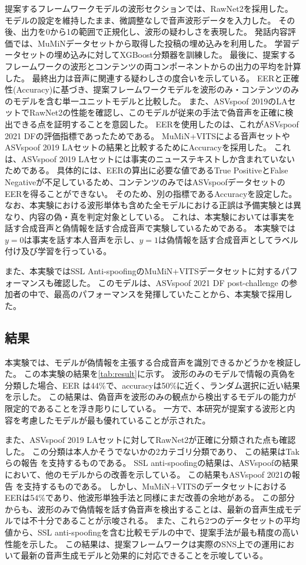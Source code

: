 提案するフレームワークモデルの波形セクションでは、RawNet2を採用した。
モデルの設定を維持したまま、微調整なしで音声波形データを入力した。
その後、出力を0から1の範囲で正規化し、波形の疑わしさを表現した。
発話内容評価では、MuMiNデータセットから取得した投稿の埋め込みを利用した。
学習データセットの埋め込みに対してXGBoost分類器を訓練した。
最後に、提案するフレームワークの波形とコンテンツの両コンポーネントからの出力の平均を計算した。
最終出力は音声に関連する疑わしさの度合いを示している。
EERと正確性(Accuracy)に基づき、提案フレームワークモデルを波形のみ・コンテンツのみのモデルを含む単一ユニットモデルと比較した。 
また、ASVspoof 2019のLAセットでRawNet2の性能を確認し、このモデルが従来の手法で偽音声を正確に検出できる点を証明することを意図した。
EERを使用したのは、これがASVspoof 2021 DFの評価指標であったためである。
MuMiN+VITSによる音声セットやASVspoof 2019 LAセットの結果と比較するためにAccuracyを採用した。
これは、ASVspoof 2019 LAセットには事実のニューステキストしか含まれていないためである。
具体的には、EERの算出に必要な値であるTrue PositiveとFalse Negativeが不足しているため、コンテンツのみではASVspoofデータセットのEERを得ることができない。
そのため、別の指標であるAccuracyを設定した。
なお、本実験における波形単体も含めた全モデルにおける正誤は予備実験とは異なり、内容の偽・真を判定対象としている。
これは、本実験においては事実を話す合成音声と偽情報を話す合成音声で実験しているためである。
本実験では$y=0$は事実を話す本人音声を示し、$y=1$は偽情報を話す合成音声としてラベル付け及び学習を行っている。

また、本実験ではSSL Anti-spoofingのMuMiN+VITSデータセットに対するパフォーマンスも確認した。
このモデルは、ASVspoof 2021 DF post-challenge \cite{10155166}の参加者の中で、最高のパフォーマンスを発揮していたことから、本実験で採用した。

\subsection{結果}\label{sec:cnt_res}
本実験では、モデルが偽情報を主張する合成音声を識別できるかどうかを検証した。
この本実験の結果を\cref{tab:result}に示す。
波形のみのモデルで情報の真偽を分類した場合、EER は44\%で、accuracyは50\%に近く、ランダム選択に近い結果を示した。
この結果は、偽音声を波形のみの観点から検出するモデルの能力が限定的であることを浮き彫りにしている。
一方で、本研究が提案する波形と内容を考慮したモデルが最も優れていることが示された。

また、ASVspoof 2019 LAセットに対してRawNet2が正確に分類された点も確認した。
この分類は本人かそうでないかの2カテゴリ分類であり、
この結果はTakらの報告 \cite{9414234}を支持するものである。
SSL anti-spoofingの結果は、ASVspoofの結果において、他のモデルからの改善を示している。
この結果もASVspoof 2021の報告 \cite{10155166}を支持するものである。
しかし、MuMiN+VITSのデータセットにおけるEERは54\%であり、他波形単独手法と同様にまだ改善の余地がある。
この部分からも、波形のみで偽情報を話す偽音声を検出することは、最新の音声生成モデルでは不十分であることが示唆される。
また、これら2つのデータセットの平均値から、SSL anti-spoofingを含む比較モデルの中で、提案手法が最も精度の高い性能を示した。
この結果は、提案フレームワークは実際のSNS上での運用において最新の音声生成モデルと効果的に対応できることを示唆している。

